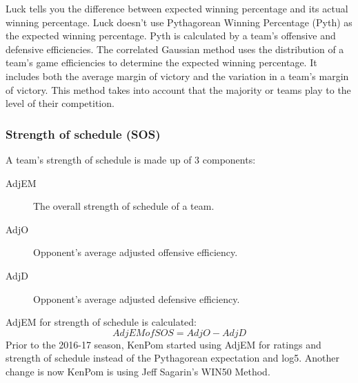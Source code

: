 \documentclass[
10pt, %
a4paper, %
oneside, %
headinclude,footinclude, %
BCOR5mm, %
]{scrartcl}
\begin{document}
Luck tells you the difference between expected winning percentage and its actual winning percentage.
Luck doesn't use Pythagorean Winning Percentage (Pyth) as the expected winning percentage. Pyth is calculated by a team's offensive and defensive efficiencies.
The correlated Gaussian method uses the distribution of a team's game efficiencies to determine the expected winning percentage. It includes both the average margin of victory and the variation in a team's margin of victory.
This method takes into account that the majority or teams play to the level of their competition.\cite{luck}


\subsubsection{Strength of schedule (SOS)}
A team's strength of schedule is made up of 3 components:
\begin{description}
\item[AdjEM] The overall strength of schedule of a team.
\item[AdjO] Opponent's average adjusted offensive efficiency.
\item [AdjD] Opponent's average adjusted defensive efficiency.
\end{description}
AdjEM for strength of schedule is calculated:
\[AdjEM of SOS = AdjO - AdjD\]
Prior to the 2016-17 season, KenPom started using AdjEM for ratings and strength of schedule instead of the Pythagorean expectation and log5.
Another change is now KenPom is using Jeff Sagarin's WIN50 Method.
\end{document}
